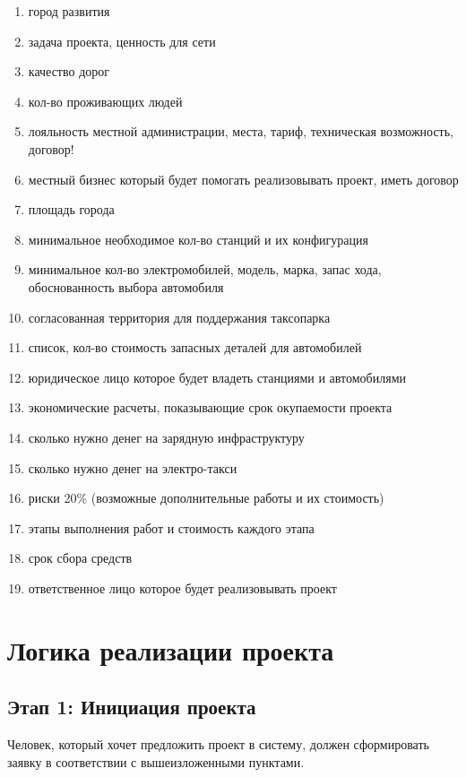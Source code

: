 \documentclass[a4paper,12pt]{report}
\begin{document}
\begin{enumerate}
	
	\item город развития
	\item задача проекта, ценность для сети
	\item качество дорог
	\item кол-во проживающих людей 
	\item лояльность местной администрации, места, тариф, техническая возможность, договор!
	\item местный бизнес который будет помогать реализовывать проект, иметь договор
	\item площадь города
	\item минимальное необходимое кол-во станций и их конфигурация
	\item минимальное кол-во электромобилей, модель, марка, запас хода, обоснованность выбора автомобиля
	\item согласованная территория для поддержания таксопарка
	\item список, кол-во стоимость запасных деталей для автомобилей
	\item юридическое лицо которое будет владеть станциями и автомобилями
	\item экономические расчеты, показывающие срок окупаемости проекта 
	\item сколько нужно денег на зарядную инфраструктуру
	\item сколько нужно денег на электро-такси
	\item риски 20\% (возможные дополнительные работы и их стоимость)
	\item этапы выполнения работ и стоимость каждого этапа
	\item срок сбора средств
	\item ответственное лицо которое будет реализовывать проект

\end{enumerate}
 
\section{Логика реализации проекта}

\subsection{Этап 1: Инициация проекта}
	Человек, который хочет предложить проект в систему, должен сформировать заявку в соответствии с вышеизложенными пунктами. 
\end{document}
